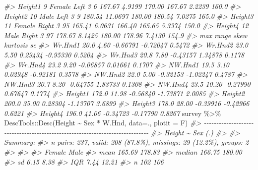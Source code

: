 \documentclass[
]{book}
\newenvironment{Shaded}{\begin{snugshade}}{\end{snugshade}}
\newcommand{\AttributeTok}[1]{\textcolor[rgb]{0.77,0.63,0.00}{#1}}
\newcommand{\CommentTok}[1]{\textcolor[rgb]{0.56,0.35,0.01}{\textit{#1}}}
\newcommand{\FunctionTok}[1]{\textcolor[rgb]{0.00,0.00,0.00}{#1}}
\newcommand{\NormalTok}[1]{#1}
\newcommand{\SpecialCharTok}[1]{\textcolor[rgb]{0.00,0.00,0.00}{#1}}
\begin{document}
\begin{Shaded}
\begin{Highlighting}[]
\CommentTok{\#\textgreater{} Height1    9 Female   Left    3   6 167.67  4.9199 170.00  167.67 2.2239 160.0}
\CommentTok{\#\textgreater{} Height2   10   Male   Left    3   9 180.54 11.0697 180.00  180.54 7.0275 165.0}
\CommentTok{\#\textgreater{} Height3   11 Female  Right    3  95 165.41  6.0631 166.40  165.65 5.3374 150.0}
\CommentTok{\#\textgreater{} Height4   12   Male  Right    3  97 178.67  8.1425 180.00  178.96 7.4130 154.9}
\CommentTok{\#\textgreater{}           max range     skew kurtosis     se}
\CommentTok{\#\textgreater{} Wr.Hnd1  20.0  4.60 {-}0.66791 {-}0.72047 0.5472}
\CommentTok{\#\textgreater{} Wr.Hnd2  23.0  5.50  0.29434 {-}0.95330 0.5204}
\CommentTok{\#\textgreater{} Wr.Hnd3  20.8  7.80 {-}0.43157  1.34878 0.1178}
\CommentTok{\#\textgreater{} Wr.Hnd4  23.2  9.20 {-}0.06857  0.01661 0.1707}
\CommentTok{\#\textgreater{} NW.Hnd1  19.5  3.10  0.02948 {-}0.92181 0.3578}
\CommentTok{\#\textgreater{} NW.Hnd2  22.0  5.00 {-}0.32153 {-}1.02247 0.4787}
\CommentTok{\#\textgreater{} NW.Hnd3  20.7  8.20 {-}0.64755  1.83733 0.1308}
\CommentTok{\#\textgreater{} NW.Hnd4  23.5 10.20 {-}0.27990  0.67647 0.1774}
\CommentTok{\#\textgreater{} Height1 172.0 11.98 {-}0.56840 {-}1.73871 2.0085}
\CommentTok{\#\textgreater{} Height2 200.0 35.00  0.28304 {-}1.13707 3.6899}
\CommentTok{\#\textgreater{} Height3 178.0 28.00 {-}0.39916 {-}0.42966 0.6221}
\CommentTok{\#\textgreater{} Height4 196.0 41.06 {-}0.34723 {-}0.17790 0.8267}
\NormalTok{survey }\SpecialCharTok{\%\textgreater{}\%}\NormalTok{  DescTools}\SpecialCharTok{::}\FunctionTok{Desc}\NormalTok{(Height }\SpecialCharTok{\textasciitilde{}}\NormalTok{ Sex }\SpecialCharTok{*}\NormalTok{ W.Hnd, }\AttributeTok{data=}\NormalTok{., }\AttributeTok{plotit =}\NormalTok{ F)}
\CommentTok{\#\textgreater{} {-}{-}{-}{-}{-}{-}{-}{-}{-}{-}{-}{-}{-}{-}{-}{-}{-}{-}{-}{-}{-}{-}{-}{-}{-}{-}{-}{-}{-}{-}{-}{-}{-}{-}{-}{-}{-}{-}{-}{-}{-}{-}{-}{-}{-}{-}{-}{-}{-}{-}{-}{-}{-}{-}{-}{-}{-}{-}{-}{-}{-}{-}{-}{-}{-}{-}{-}{-}{-}{-}{-}{-}{-}{-}{-}{-}{-}{-} }
\CommentTok{\#\textgreater{} Height \textasciitilde{} Sex (.)}
\CommentTok{\#\textgreater{} }
\CommentTok{\#\textgreater{} Summary: }
\CommentTok{\#\textgreater{} n pairs: 237, valid: 208 (87.8\%), missings: 29 (12.2\%), groups: 2}
\CommentTok{\#\textgreater{} }
\CommentTok{\#\textgreater{}                       }
\CommentTok{\#\textgreater{}         Female    Male}
\CommentTok{\#\textgreater{} mean    165.69  178.83}
\CommentTok{\#\textgreater{} median  166.75  180.00}
\CommentTok{\#\textgreater{} sd        6.15    8.38}
\CommentTok{\#\textgreater{} IQR       7.44   12.21}
\CommentTok{\#\textgreater{} n          102     106}

\end{Highlighting}
\end{Shaded}
\end{document}
